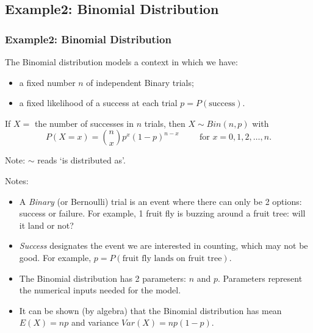 \documentclass[t,xcolor=pdftex,dvipsnames,table]{beamer}\usepackage[]{graphicx}\usepackage[]{color}
\begin{document}
\subsection{Example2: Binomial Distribution}
\begin{frame}\frametitle{Example2: Binomial Distribution}
\begin{definition}
The \alert{Binomial distribution} models a context in which we have:
\begin{itemize}
\item a fixed number $n$ of independent Binary trials; 
\item  a fixed likelihood of a success at each trial $p=P(\mbox{success})$. 
\end{itemize}

\vspace{.5cm}
If $X =$ the number of successes in $n$ trials, then  $X \sim Bin(n,p)$ with
\[ P(X=x) = {n \choose x} p^x (1-p)^{n-x} \hspace{1cm} \mbox{for } x=0,1,2,\ldots,n. \]
\end{definition}

\vspace{.5cm}
Note:  $\sim$ reads `is distributed as'.
\hyperlink{Factorials}{}
\hyperlink{BinomialCoefficients}{}
\end{frame}

\begin{frame}
Notes:
\begin{itemize}
\item A {\it Binary} (or Bernoulli) trial is an event where there can only be 2 options: success or failure. For example, 1 fruit fly is buzzing around a fruit tree: will it land or not?
\item {\it Success} designates the event we are interested in counting, which may not be good. For example,  $p=P(\mbox{fruit fly lands on fruit tree})$.
\item The Binomial distribution has 2 parameters: $n$ and $p$. Parameters represent the numerical inputs needed for the model.
\item It can be shown (by algebra) that the Binomial distribution has mean $E(X)=np$ and variance $Var(X)=np(1-p)$.
\end{itemize}
\end{frame}
\end{document}
